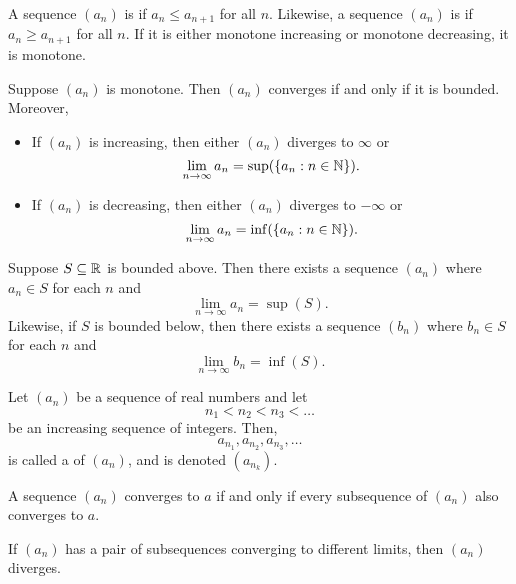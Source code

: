 \documentclass[11pt,twoside=off,numbers=noenddot]{scrbook}
\begin{document}
\begin{definition}
    A sequence $(a_n)$ is  if $a_n \leq a_{n + 1}$ for all $n$. Likewise, a sequence $(a_n)$ is  if $a_n \geq a_{n + 1}$ for all $n$. If it is either monotone increasing or monotone decreasing, it is monotone.
\end{definition}

\begin{theorem}
    Suppose $(a_n)$ is monotone. Then $(a_n)$ converges if and only if it is bounded. Moreover,
    \begin{itemize}
        \item If $(a_n)$ is increasing, then either $(a_n)$ diverges to $\infty$ or
        \[ \lim_{n \to \infty} a_n = \sup(\{ a_n : n \in \mathbb N \}). \]
        \item If $(a_n)$ is decreasing, then either $(a_n)$ diverges to $-\infty$ or
        \[ \lim_{n \to \infty} a_n = \inf(\{ a_n : n \in \mathbb N \}). \]
    \end{itemize}
\end{theorem}

\begin{proposition}
    Suppose $S \subseteq \mathbb R$ is bounded above. Then there exists a sequence $(a_n)$ where $a_n \in S$ for each $n$ and
    \[ \lim_{n \to \infty} a_n = \sup(S). \]
    Likewise, if $S$ is bounded below, then there exists a sequence $(b_n)$ where $b_n \in S$ for each $n$ and
    \[ \lim_{n \to \infty} b_n = \inf(S). \]
\end{proposition}

\begin{definition}
    Let $(a_n)$ be a sequence of real numbers and let
    \[ n_1 < n_2 < n_3 < \dots \]
    be an increasing sequence of integers. Then,
    \[ a_{n_1}, a_{n_2}, a_{n_3}, \dots \]
    is called a  of $(a_n)$, and is denoted $(a_{n_k})$.
\end{definition}

\begin{proposition}
    A sequence $(a_n)$ converges to $a$ if and only if every subsequence of $(a_n)$ also converges to $a$.
\end{proposition}

\begin{corollary}
    If $(a_n)$ has a pair of subsequences converging to different limits, then $(a_n)$ diverges.
\end{corollary}
\end{document}

